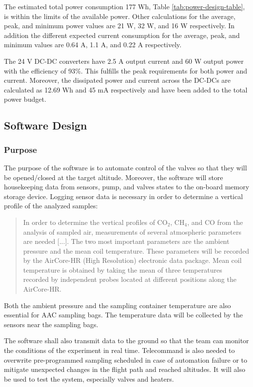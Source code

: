 \documentclass[a4paper,12pt,twoside]{article}
\begin{document}
The estimated total power consumption 177 Wh, Table \ref{tab:power-design-table}, is within the limits of the available power. Other calculations for the average, peak, and minimum power values are 21 W, 32 W, and 16 W respectively. In addition the different expected current consumption for the average, peak, and minimum values are 0.64 A, 1.1 A, and 0.22 A respectively.

The 24 V DC-DC converters have 2.5 A output current and 60 W output power with the efficiency of 93\%. This fulfills the peak requirements for both power and current. Moreover, the dissipated power and current across the DC-DCs are calculated as 12.69 Wh and 45 mA respectively and have been added to the total power budget. 



\raggedbottom

\pagebreak
\subsection{Software Design}
\subsubsection{Purpose}
The purpose of the software is to automate control of the valves so that they will be opened/closed at the target altitude. Moreover, the software will store housekeeping data from sensors, pump, and valves states to the on-board memory storage device. Logging sensor data is necessary in order to determine a vertical profile of the analyzed samples:

\begin{quote}
In order to determine the vertical profiles of CO$_2$, CH$_4$, and CO from the analysis of sampled air, measurements of several atmospheric parameters are needed [...]. The two most important parameters are the ambient pressure and the mean coil temperature. These parameters will be recorded by the AirCore-HR (High Resolution) electronic data package. Mean coil temperature is obtained by taking the mean of three temperatures recorded by independent probes located at different positions along the AirCore-HR.\cite{Membrive}
\end{quote}

Both the ambient pressure and the sampling container temperature are also essential for AAC sampling bags. The temperature data will be collected by the sensors near the sampling bags.

The software shall also transmit data to the ground so that the team can monitor the conditions of the experiment in real time. Telecommand is also needed to overwrite pre-programmed sampling scheduled in case of automation failure or to mitigate unexpected changes in the flight path and reached altitudes. It will also be used to test the system, especially valves and heaters.\par
\end{document}
